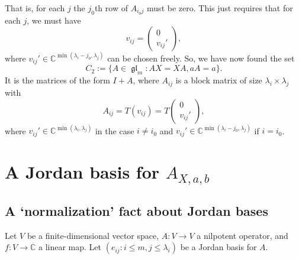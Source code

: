 \documentclass[12pt,psamsfonts]{article}
\DeclareMathOperator{\gl}{\mathfrak{gl}}
\begin{document}
That is, for each \(j\) the \(j_0\)th row of \(A_{i_0j}\) must be zero.
This just requires that for each \(j\), we must have 
\[v_{ij} = \begin{pmatrix}
    0\\
    v_{ij}'
\end{pmatrix},\]
where \(v_{ij}' \in \mathbb{C}^{\min(\lambda_i - j_0, \lambda_j)}\) can be chosen freely.
So, we have now found the set 
\[C_2 := \{A \in \gl_m : AX = XA, aA = a\}.\]
It is the matrices of the form \(I + A\), where \(A_{ij}\) is a block matrix of size \(\lambda_i \times \lambda_j\) with 
\[A_{ij} = T(v_{ij}) = T\begin{pmatrix}
    0\\
    v_{ij}'
\end{pmatrix},\]
where \(v_{ij}' \in \mathbb{C}^{\min(\lambda_i, \lambda_j)}\) in the case \(i \neq i_0\) and \(v_{ij}' \in \mathbb{C}^{\min(\lambda_i - j_0, \lambda_j)}\) if \(i = i_0\).

\section{A Jordan basis for \(A_{X, a, b}\)}

\subsection{A `normalization' fact about Jordan bases}
Let \(V\) be a finite-dimensional vector space, \(A : V \to V\) a nilpotent operator, and \(f : V \to \mathbb{C}\) a linear map.
Let \((e_{ij} : i \leq m, j \leq \lambda_i)\) be a Jordan basis for \(A\).
\end{document}
